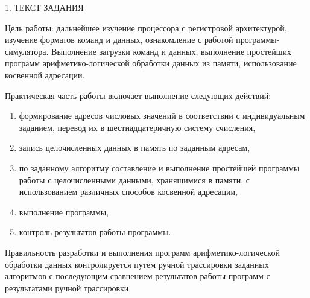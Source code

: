 \begin{center}
    1. ТЕКСТ ЗАДАНИЯ
\end{center}

Цель работы: дальнейшее изучение процессора с регистровой архитектурой, изучение форматов команд и данных, ознакомление
с работой программы-симулятора. Выполнение загрузки команд и данных, 
выполнение простейших программ арифметико-логической обработки данных из памяти, использование косвенной адресации.

Практическая часть работы включает выполнение следующих действий:
\begin{enumerate}
    \item формирование адресов числовых значений в соответствии с индивидуальным заданием, перевод их в шестнадцатеричную систему счисления,
    \item запись целочисленных данных в память по заданным адресам,
    \item по заданному алгоритму составление и выполнение простейшей программы работы с целочисленными данными, хранящимися в памяти, 
        с использованием различных способов косвенной адресации,
    \item выполнение программы,
    \item контроль результатов работы программы.
\end{enumerate}

Правильность разработки и выполнения программ арифметико-логической обработки данных 
контролируется путем ручной трассировки заданных алгоритмов 
с последующим сравнением результатов работы программ с результатами ручной трассировки